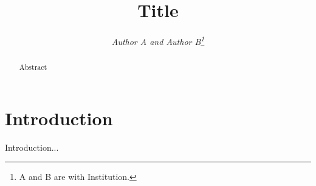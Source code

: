 \documentclass[11pt]{article}
\begin{document}
\title{\bf Title}
\author{\large\em Author A and Author B\thanks{
%
A and B are with Institution.}}

\date{} %

\maketitle


\begin{abstract}\noindent

Abstract

\end{abstract}



\section{Introduction}
Introduction...



\begin{footnotesize}


\end{footnotesize}
\end{document}
